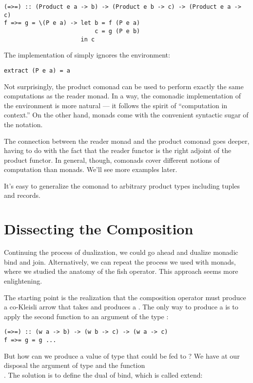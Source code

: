 \begin{verbatim}
(=>=) :: (Product e a -> b) -> (Product e b -> c) -> (Product e a -> c)
f =>= g = \(P e a) -> let b = f (P e a)
                          c = g (P e b) 
                      in c
\end{verbatim}
The implementation of  simply ignores the environment:

\begin{Verbatim}[commandchars=\\\{\}]
extract (P e a) = a
\end{Verbatim}
Not surprisingly, the product comonad can be used to perform exactly the
same computations as the reader monad. In a way, the comonadic
implementation of the environment is more natural --- it follows the
spirit of ``computation in context.'' On the other hand, monads come
with the convenient syntactic sugar of the  notation.

The connection between the reader monad and the product comonad goes
deeper, having to do with the fact that the reader functor is the right
adjoint of the product functor. In general, though, comonads cover
different notions of computation than monads. We'll see more examples
later.

It's easy to generalize the  comonad to arbitrary
product types including tuples and records.

\section{Dissecting the
Composition}\label{dissecting-the-composition}

Continuing the process of dualization, we could go ahead and dualize
monadic bind and join. Alternatively, we can repeat the process we used
with monads, where we studied the anatomy of the fish operator. This
approach seems more enlightening.

The starting point is the realization that the composition operator must
produce a co-Kleisli arrow that takes  and produces a
. The only way to produce a  is to apply the second
function to an argument of the type :

\begin{Verbatim}[commandchars=\\\{\}]
(=>=) :: (w a -> b) -> (w b -> c) -> (w a -> c)
f =>= g = g ... 
\end{Verbatim}
But how can we produce a value of type  that could be fed
to ? We have at our disposal the argument of type
 and the function\\ .
The solution is to define the dual of bind, which is called extend:

